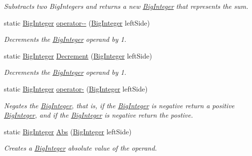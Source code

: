\begin{DoxyCompactItemize}
\begin{DoxyCompactList}\small\item\em Substracts two Big\+Integers and returns a new \hyperlink{class_scott_garland_1_1_big_integer}{Big\+Integer} that represents the sum. \end{DoxyCompactList}\item 
static \hyperlink{class_scott_garland_1_1_big_integer}{Big\+Integer} \hyperlink{class_scott_garland_1_1_big_integer_af2f8450c10cface5a4b597f1a7c53945}{operator-\/-\/} (\hyperlink{class_scott_garland_1_1_big_integer}{Big\+Integer} left\+Side)
\begin{DoxyCompactList}\small\item\em Decrements the \hyperlink{class_scott_garland_1_1_big_integer}{Big\+Integer} operand by 1. \end{DoxyCompactList}\item 
static \hyperlink{class_scott_garland_1_1_big_integer}{Big\+Integer} \hyperlink{class_scott_garland_1_1_big_integer_affa766b6b0b77a333971307b90a66aa0}{Decrement} (\hyperlink{class_scott_garland_1_1_big_integer}{Big\+Integer} left\+Side)
\begin{DoxyCompactList}\small\item\em Decrements the \hyperlink{class_scott_garland_1_1_big_integer}{Big\+Integer} operand by 1. \end{DoxyCompactList}\item 
static \hyperlink{class_scott_garland_1_1_big_integer}{Big\+Integer} \hyperlink{class_scott_garland_1_1_big_integer_a8584125cc3f3256f1496a1f6ca32720e}{operator-\/} (\hyperlink{class_scott_garland_1_1_big_integer}{Big\+Integer} left\+Side)
\begin{DoxyCompactList}\small\item\em Negates the \hyperlink{class_scott_garland_1_1_big_integer}{Big\+Integer}, that is, if the \hyperlink{class_scott_garland_1_1_big_integer}{Big\+Integer} is negative return a positive \hyperlink{class_scott_garland_1_1_big_integer}{Big\+Integer}, and if the \hyperlink{class_scott_garland_1_1_big_integer}{Big\+Integer} is negative return the postive. \end{DoxyCompactList}\item 
static \hyperlink{class_scott_garland_1_1_big_integer}{Big\+Integer} \hyperlink{class_scott_garland_1_1_big_integer_a885dbd49d878ba22013da4efda83545a}{Abs} (\hyperlink{class_scott_garland_1_1_big_integer}{Big\+Integer} left\+Side)
\begin{DoxyCompactList}\small\item\em Creates a \hyperlink{class_scott_garland_1_1_big_integer}{Big\+Integer} absolute value of the operand. \end{DoxyCompactList}\item 

\end{DoxyCompactItemize}
